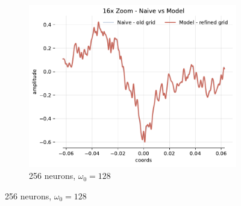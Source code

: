 \begin{figure}[h]
\begin{subfigure}[b]{0.32\textwidth}
    \end{subfigure}
    \begin{subfigure}[b]{0.32\textwidth}
        \centering
        \includegraphics[width=\textwidth]{img/ch4/16x-zoom-1hl-256hf-128hz.pdf}
        \caption{256 neurons, $\omega_0=128$}
        \label{fig:16x-zoom-1hl-256hf-128hz}
    \end{subfigure}


\end{figure}
